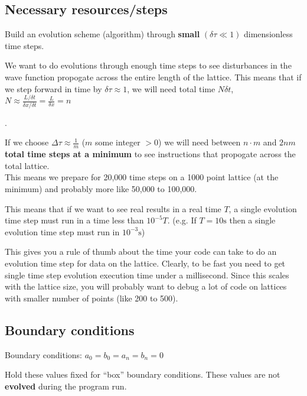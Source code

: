 \documentclass[11pt,letterpaper]{article}
\begin{document}
	\subsection{Necessary resources/steps}
	\begin{description}[leftmargin=6em,style=nextline]
		\item[Next] Build an evolution scheme (algorithm) through \textbf{small} $(\delta \tau \ll 1)$ dimensionless time steps.
		\item[Tradeoff] We want to do evolutions through enough time steps to see disturbances in the wave function propogate across the entire length of the lattice. This means that if we step forward in time by $\delta \tau \approx 1$, we will need total time $N\delta t$, $N \approx \frac{L/\delta t}{\delta x / \delta t} = \frac{L}{\delta x} = n$\par.
	\end{description}
	If we choose $\Delta \tau \approx \frac{1}{m}$ ($m$ some integer $> 0$) we will need between $n \cdot m$ and \textbf{$2nm$ total time steps at a minimum} to see instructions that propogate across the total lattice.\\
	This means we prepare for 20,000 time steps on a 1000 point lattice (at the minimum) and probably more like 50,000 to 100,000.\par
	This means that if we want to see real results in a real time $T$, a single evolution time step must run in a time less than $10^{-5} T$. (e.g. If $T=10\si{\second}$ then a single evolution time step must run in $10^{-3}\si{\second}$)\par
	This gives you a rule of thumb about the time your code can take to do an evolution time step for data on the lattice. Clearly, to be fast you need to get single time step evolution execution time under a millisecond. Since this scales with the lattice size, you will probably want to debug a lot of code on lattices with smaller number of points (like 200 to 500).
	\subsection{Boundary conditions}
	Boundary conditions: $a_0=b_0=a_n=b_n=0$\par
	Hold these values fixed for ``box'' boundary conditions. These values are not \textbf{evolved} during the program run.
\end{document}
